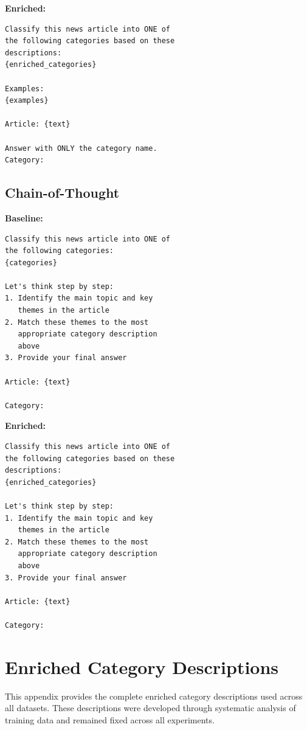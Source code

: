 \documentclass[sigconf,nonacm]{acmart}
\begin{document}
\textbf{Enriched:}
\begin{small}
\begin{verbatim}
Classify this news article into ONE of 
the following categories based on these 
descriptions:
{enriched_categories}

Examples:
{examples}

Article: {text}

Answer with ONLY the category name.
Category:
\end{verbatim}
\end{small}

\subsection{Chain-of-Thought}

\textbf{Baseline:}
\begin{small}
\begin{verbatim}
Classify this news article into ONE of 
the following categories:
{categories}

Let's think step by step:
1. Identify the main topic and key 
   themes in the article
2. Match these themes to the most 
   appropriate category description 
   above
3. Provide your final answer

Article: {text}

Category:
\end{verbatim}
\end{small}

\textbf{Enriched:}
\begin{small}
\begin{verbatim}
Classify this news article into ONE of 
the following categories based on these 
descriptions:
{enriched_categories}

Let's think step by step:
1. Identify the main topic and key 
   themes in the article
2. Match these themes to the most 
   appropriate category description 
   above
3. Provide your final answer

Article: {text}

Category:
\end{verbatim}
\end{small}

\section{Enriched Category Descriptions}
\label{app:enriched}

This appendix provides the complete enriched category descriptions used across all datasets. These descriptions were developed through systematic analysis of training data and remained fixed across all experiments.
\end{document}

